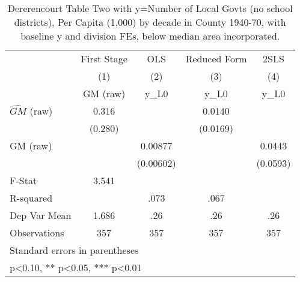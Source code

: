 \begin{table}[htbp]\centering
\def\sym#1{\ifmmode^{#1}\else\(^{#1}\)\fi}
\caption{Dererencourt Table Two with y=Number of Local Govts (no school districts), Per Capita (1,000) by decade in County 1940-70, with baseline y and division FEs, below median area incorporated.}
\begin{tabular}{l*{4}{c}}
\toprule
                    & First Stage   &         OLS   &Reduced Form   &        2SLS   \\
                    &\multicolumn{1}{c}{(1)}&\multicolumn{1}{c}{(2)}&\multicolumn{1}{c}{(3)}&\multicolumn{1}{c}{(4)}\\
                    &\multicolumn{1}{c}{GM  (raw)}&\multicolumn{1}{c}{y\_L0}&\multicolumn{1}{c}{y\_L0}&\multicolumn{1}{c}{y\_L0}\\
\midrule
$\hat{GM}$ (raw)    &       0.316   &               &      0.0140   &               \\
                    &     (0.280)   &               &    (0.0169)   &               \\
\addlinespace
GM  (raw)           &               &     0.00877   &               &      0.0443   \\
                    &               &   (0.00602)   &               &    (0.0593)   \\
\midrule
F-Stat              &       3.541   &               &               &               \\
R-squared           &               &        .073   &        .067   &               \\
Dep Var Mean        &       1.686   &         .26   &         .26   &         .26   \\
Observations        &         357   &         357   &         357   &         357   \\
\bottomrule
\multicolumn{5}{l}{\footnotesize Standard errors in parentheses}\\
\multicolumn{5}{l}{\footnotesize * p<0.10, ** p<0.05, *** p<0.01}\\
\end{tabular}
\end{table}
